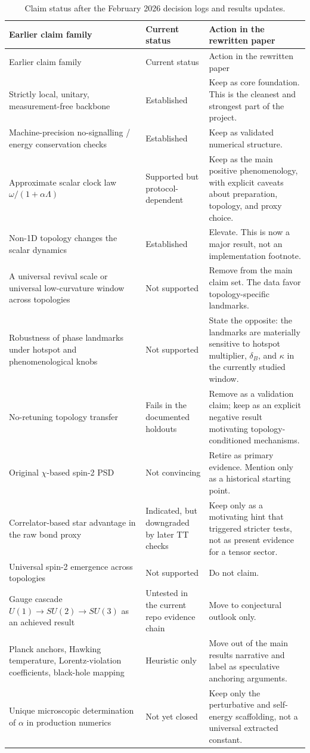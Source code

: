 \documentclass[11pt]{article}
\begin{document}
\begin{longtable}{@{}p{}p{}p{}@{}}
\caption{Claim status after the February 2026 decision logs and results updates.}
\label{tab:claim-status}\\
\toprule
Earlier claim family & Current status & Action in the rewritten paper \\
\midrule
\endfirsthead
\toprule
Earlier claim family & Current status & Action in the rewritten paper \\
\midrule
\endhead
Strictly local, unitary, measurement-free backbone & Established & Keep as core foundation. This is the cleanest and strongest part of the project. \\
Machine-precision no-signalling / energy conservation checks & Established & Keep as validated numerical structure. \\
Approximate scalar clock law $\omega/(1+\alpha\Lambda)$ & Supported but protocol-dependent & Keep as the main positive phenomenology, with explicit caveats about preparation, topology, and proxy choice. \\
Non-1D topology changes the scalar dynamics & Established & Elevate. This is now a major result, not an implementation footnote. \\
A universal revival scale or universal low-curvature window across topologies & Not supported & Remove from the main claim set. The data favor topology-specific landmarks. \\
Robustness of phase landmarks under hotspot and phenomenological knobs & Not supported & State the opposite: the landmarks are materially sensitive to hotspot multiplier, $\delta_B$, and $\kappa$ in the currently studied window. \\
No-retuning topology transfer & Fails in the documented holdouts & Remove as a validation claim; keep as an explicit negative result motivating topology-conditioned mechanisms. \\
Original $\chi$-based spin-2 PSD & Not convincing & Retire as primary evidence. Mention only as a historical starting point. \\
Correlator-based star advantage in the raw bond proxy & Indicated, but downgraded by later TT checks & Keep only as a motivating hint that triggered stricter tests, not as present evidence for a tensor sector. \\
Universal spin-2 emergence across topologies & Not supported & Do not claim. \\
Gauge cascade $U(1)\to SU(2)\to SU(3)$ as an achieved result & Untested in the current repo evidence chain & Move to conjectural outlook only. \\
Planck anchors, Hawking temperature, Lorentz-violation coefficients, black-hole mapping & Heuristic only & Move out of the main results narrative and label as speculative anchoring arguments. \\
Unique microscopic determination of $\alpha$ in production numerics & Not yet closed & Keep only the perturbative and self-energy scaffolding, not a universal extracted constant. \\
\bottomrule
\end{longtable}
\end{document}
